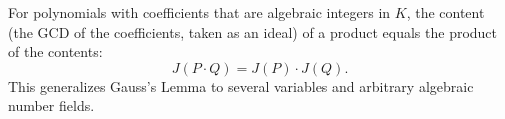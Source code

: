 For polynomials with coefficients that are algebraic integers in $K$, the content (the GCD of the coefficients, taken as an ideal) of a product equals the product of the contents:
$$J(P \cdot Q) = J(P) \cdot J(Q).$$
This generalizes Gauss's Lemma to several variables and arbitrary algebraic number fields.
